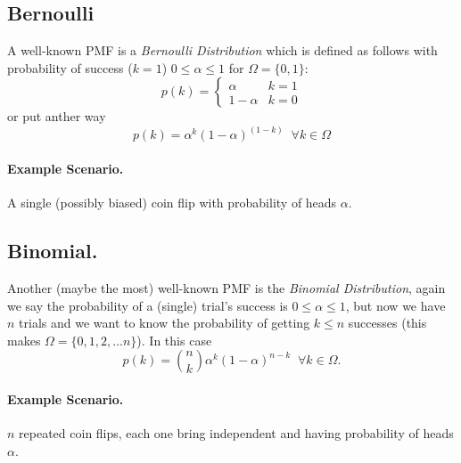 \subsection{Bernoulli} 
A well-known PMF is a \emph{Bernoulli Distribution} which is defined as follows
with probability of success ($k=1$) $0 \le \alpha \le 1$ for $\Omega = \{0,1\}$: 
\[p(k) = \begin{cases}\alpha & k=1\\1-\alpha & k=0\end{cases}\]
or put anther way
\[p(k) = \alpha^k(1-\alpha)^{(1-k)} \;\; \forall k\in\Omega\]

\paragraph{Example Scenario.} A single (possibly biased) coin flip with probability of heads $\alpha$.

\subsection{Binomial.}
Another (maybe the most) well-known PMF is the \emph{Binomial Distribution}, 
again we say the probability of a (single) trial's success is $0 \le \alpha \le 1$, 
but now we have $n$ trials and we want to know the probability of getting $k\le n$ successes 
(this makes $\Omega = \{0,1,2,...n\}$).
In this case 
\[p(k) = \binom n k \alpha^k (1-\alpha)^{n-k} \;\; \forall k\in\Omega.\]

\paragraph{Example Scenario.} $n$ repeated coin flips, each one bring independent and having probability of heads $\alpha$.

\begin{center}
\end{center}


